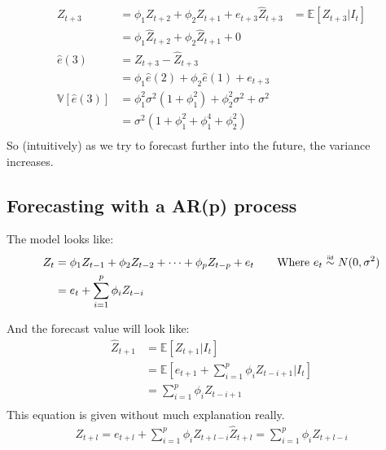 \begin{equation*}
    \begin{aligned}
        Z_{t+3} &= \phi_{1} Z_{t+2} + \phi_{2} Z_{t+1} + e_{t+3}
        \hat{Z}_{t+3} &= \mathbb{E}\left[Z_{t+3} | I_{t}\right] \\
                      &= \phi_{1} \hat{Z}_{t+2} + \phi_{2} \hat{Z}_{t+1} + 0 \\
        \hat{e}(3) &= Z_{t+3} - \hat{Z}_{t+3} \\
                   &= \phi_{1} \hat{e}(2) + \phi_{2} \hat{e}(1) + e_{t+3} \\
        \mathbb{V}\left[\hat{e}(3)\right]  &= \phi_{1}^{2} \sigma^{2}(1 +
        \phi_{1}^{2}) + \phi_{2}^{2}\sigma^{2} + \sigma^{2}\\
                                           &= \sigma^{2} \left( 1 +
                                           \phi_{1}^{2} + \phi_{1}^{4} +
                                       \phi_{2}^{2} \right) \\
    \end{aligned}
\end{equation*}
So (intuitively) as we try to forecast further into the future, the variance
increases.

\subsection{Forecasting with a AR(p) process}
The model looks like:
\begin{equation*}
    \begin{aligned}
        Z_{t} &= \phi_{1} Z_{t-1} + \phi_{2}Z_{t-2} + \dots + \phi_{p} Z_{t-p} +
        e_{t} \qquad \text{Where $e_t \iid N(0, \sigma^2)$}\\
              &= e_{t} + \sum_{i=1}^{p} \phi_{i}Z_{t-i} \\
    \end{aligned}
\end{equation*}

And the forecast value will look like:
\begin{equation*}
    \begin{aligned}
        \hat{Z}_{t+1} &= \mathbb{E}\left[Z_{t+1} | I_{t}\right]  \\
                      &= \mathbb{E}\left[ e_{t+1} + \sum_{i=1}^{p} \phi_{i}Z_{t-i+1} | I_{t} \right]  \\
                      &= \sum_{i=1}^{p} \phi_{i}Z_{t-i+1} \\
    \end{aligned}
\end{equation*}
This equation is given without much explanation really.
\begin{equation*}
    \begin{aligned}
        Z_{t+l} = e_{t+l} + \sum_{i=1}^{p} \phi_{i} Z_{t + l - i}
        \hat{Z}_{t+l} = \sum_{i=1}^{p} \phi_{i} Z_{t + l - i}
    \end{aligned}
\end{equation*}

